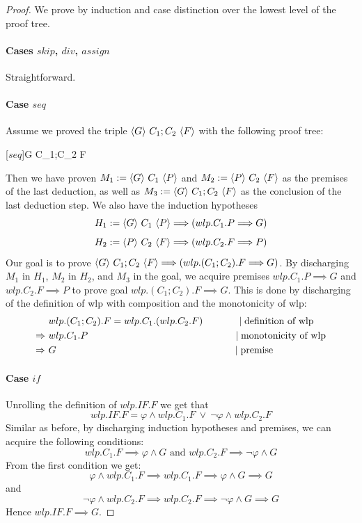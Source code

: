 \begin{proof}
	We prove by induction and case distinction over the lowest level of the proof tree. 
	\paragraph{Cases $skip$, $div$, $assign$} Straightforward.
	\paragraph{Case $seq$} 
	Assume we proved the triple $\langle G \rangle\ C_1;C_2\ \langle F \rangle$ with the following proof tree: 
	\begin{center}
		\begin{prooftree}
			\Ellipsis{}{ }
			[$seq$]{\nlp G {C_1;C_2} F}
		\end{prooftree}
	\end{center}
	Then we have proven $M_1:=\langle G \rangle\ C_1\ \langle P \rangle $ and $M_2:=\langle P \rangle\ C_2\ \langle F \rangle $ as the premises of the last deduction, as well as $M_3:=\langle G \rangle\ C_1;C_2\ \langle F \rangle$ as the conclusion of the last deduction step.
	We also have the induction hypotheses $$H_1:=\langle G \rangle\ C_1\ \langle P \rangle {\implies} (wlp.C_1.P{\implies} G)$$ 
	$$H_2:=\langle P \rangle\ C_2\ \langle F \rangle {\implies} (wlp.C_2.F{\implies} P)$$
	Our goal is to prove $\langle G \rangle\ C_1;C_2\ \langle F \rangle {\implies} (wlp.(C_1;C_2).F{\implies} G)$. 
	By discharging $M_1$ in $H_1$, $M_2$ in $H_2$, and $M_3$ in the goal, we acquire premises $wlp.C_1.P{\implies} G$ and $wlp.C_2.F{\implies} P$ to prove goal $wlp.(C_1;C_2).F{\implies} G$. 
	This is done by discharging of the definition of wlp with composition and the monotonicity of wlp: 
	\begin{align*}
		&\ wlp.(C_1;C_2).F = wlp.C_1.(wlp.C_2.F) 
		\hspace{0.1\linewidth}\mid \text{definition of wlp} \\
		\Rightarrow &\ wlp.C_1.P  
		\hspace{0.433\linewidth}\mid \text{monotonicity of wlp}\\
		\Rightarrow &\ G  
		\hspace{0.527\linewidth}\mid \text{premise}
	\end{align*}

	\paragraph{Case $if$}
	Unrolling the definition of $wlp.IF.F$ we get that 
	$$wlp.IF.F = \varphi\wedge wlp.C_1.F\ \vee\ \neg\varphi\wedge wlp.C_2.F$$ 
	Similar as before, by discharging induction hypotheses and premises, we can acquire the following conditions: 
	$$wlp.C_1.F\implies\varphi\wedge G \text{ and }
	 wlp.C_2.F\implies\neg\varphi\wedge G $$
	From the first condition we get: 
	$$\varphi\wedge wlp.C_1.F\implies wlp.C_1.F \implies \varphi\wedge G\implies G$$
	and 
	$$\neg\varphi\wedge wlp.C_2.F\implies wlp.C_2.F \implies \neg\varphi\wedge G\implies G$$
	Hence $wlp.IF.F \implies G$. 

\end{proof}
